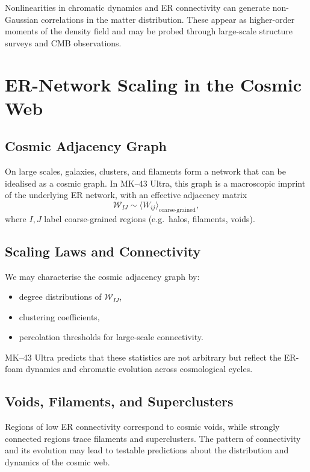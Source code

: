 Nonlinearities in chromatic dynamics and ER connectivity can generate non-Gaussian correlations in the matter distribution.
These appear as higher-order moments of the density field and may be probed through large-scale structure surveys and CMB observations.

\chapter{ER-Network Scaling in the Cosmic Web}

\section{Cosmic Adjacency Graph}

On large scales, galaxies, clusters, and filaments form a network that can be idealised as a cosmic graph.
In MK--43 Ultra, this graph is a macroscopic imprint of the underlying ER network, with an effective adjacency matrix
\[
  \mathcal{W}_{IJ} \sim \langle W_{ij} \rangle_{\text{coarse-grained}},
\]
where $I,J$ label coarse-grained regions (e.g.\ halos, filaments, voids).

\section{Scaling Laws and Connectivity}

We may characterise the cosmic adjacency graph by:
\begin{itemize}
  \item degree distributions of $\mathcal{W}_{IJ}$,
  \item clustering coefficients,
  \item percolation thresholds for large-scale connectivity.
\end{itemize}
MK--43 Ultra predicts that these statistics are not arbitrary but reflect the ER-foam dynamics and chromatic evolution across cosmological cycles.

\section{Voids, Filaments, and Superclusters}

Regions of low ER connectivity correspond to cosmic voids, while strongly connected regions trace filaments and superclusters.
The pattern of connectivity and its evolution may lead to testable predictions about the distribution and dynamics of the cosmic web.

